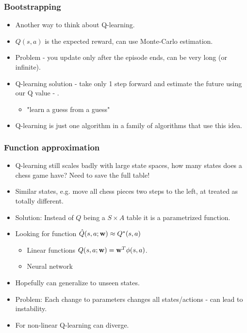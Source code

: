 \documentclass[handout]{beamer}
\begin{document}
\begin{frame}\frametitle{Bootstrapping}\small

\begin{itemize}
	\item Another way to think about Q-learning.
	\item $Q(s,a)$ is the expected reward, can use Monte-Carlo estimation.
	\onslide<2->\item Problem - you update only after the episode ends, can be very long (or infinite).
	\onslide<3->\item Q-learning solution - take only 1 step forward and estimate the future using our Q value - .
	\begin{itemize}
		\item "learn a guess from a guess"
	\end{itemize} 
	\item Q-learning is just one algorithm in a family of algorithms that use this idea.
\end{itemize}
\end{frame}

\begin{frame}\frametitle{Function approximation}\small

\begin{itemize}
	\item Q-learning still scales badly with large state spaces, how many states does a chess game have? Need to save the full table!
	\onslide<2->\item Similar states, e.g. move all chess pieces two steps to the left, at treated as totally different.
	\onslide<3->\item Solution: Instead of $Q$ being a $S\times A$ table it is a parametrized function.
	\onslide<4-> \item Looking for function $\hat{Q}(s,a;\mathbf{w})\approx Q^*(s,a)$
	\begin{itemize}
		\item Linear functions $Q(s,a;\mathbf{w})=\mathbf{w}^T\phi(s,a)$.
		\item Neural network
	\end{itemize}
	\item Hopefully can generalize to unseen states.
	\onslide<6->\item Problem: Each change to parameters changes all states/actions - can lead to instability.
	\onslide<7->\item For non-linear Q-learning can diverge.
	
\end{itemize}
\end{frame}
\end{document}
